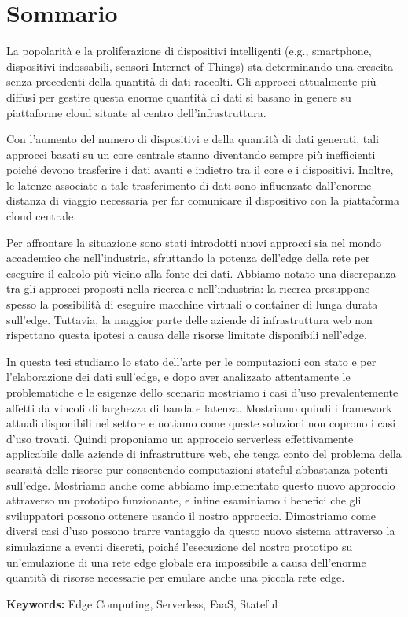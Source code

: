 \chapter*{Sommario}

La popolarità e la proliferazione di dispositivi intelligenti (e.g., smartphone, dispositivi indossabili, sensori Internet-of-Things) sta determinando una crescita senza precedenti della quantità di dati raccolti. Gli approcci attualmente più diffusi per gestire questa enorme quantità di dati si basano in genere su piattaforme cloud situate al centro dell'infrastruttura.

Con l'aumento del numero di dispositivi e della quantità di dati generati, tali approcci basati su un core centrale stanno diventando sempre più inefficienti poiché devono trasferire i dati avanti e indietro tra il core e i dispositivi. Inoltre, le latenze associate a tale trasferimento di dati sono influenzate dall'enorme distanza di viaggio necessaria per far comunicare il dispositivo con la piattaforma cloud centrale.

Per affrontare la situazione sono stati introdotti nuovi approcci sia nel mondo accademico che nell'industria, sfruttando la potenza dell'edge della rete per eseguire il calcolo più vicino alla fonte dei dati. Abbiamo notato una discrepanza tra gli approcci proposti nella ricerca e nell'industria: la ricerca presuppone spesso la possibilità di eseguire macchine virtuali o container di lunga durata sull'edge. Tuttavia, la maggior parte delle aziende di infrastruttura web non rispettano questa ipotesi a causa delle risorse limitate disponibili nell'edge.

In questa tesi studiamo lo stato dell'arte per le computazioni con stato e per l'elaborazione dei dati sull'edge, e dopo aver analizzato attentamente le problematiche e le esigenze dello scenario mostriamo i casi d'uso prevalentemente affetti da vincoli di larghezza di banda e latenza. Mostriamo quindi i framework attuali disponibili nel settore e notiamo come queste soluzioni non coprono i casi d'uso trovati. Quindi proponiamo un approccio serverless effettivamente applicabile dalle aziende di infrastrutture web, che tenga conto del problema della scarsità delle risorse pur consentendo computazioni stateful abbastanza potenti sull'edge. Mostriamo anche come abbiamo implementato questo nuovo approccio attraverso un prototipo funzionante, e infine esaminiamo i benefici che gli sviluppatori possono ottenere usando il nostro approccio. Dimostriamo come diversi casi d'uso possono trarre vantaggio da questo nuovo sistema attraverso la simulazione a eventi discreti, poiché l'esecuzione del nostro prototipo su un'emulazione di una rete edge globale era impossibile a causa dell'enorme quantità di risorse necessarie per emulare anche una piccola rete edge.

\textbf{Keywords:} Edge Computing, Serverless, FaaS, Stateful
